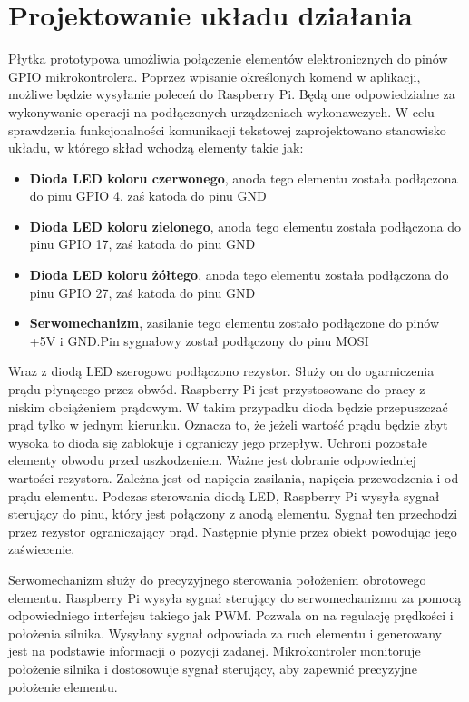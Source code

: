 \section{Projektowanie układu działania}
 Płytka prototypowa umożliwia połączenie elementów elektronicznych do pinów GPIO mikrokontrolera. Poprzez wpisanie określonych komend w aplikacji, możliwe będzie wysyłanie poleceń do Raspberry Pi. Będą one odpowiedzialne za wykonywanie operacji na podłączonych urządzeniach wykonawczych. W celu sprawdzenia funkcjonalności komunikacji tekstowej zaprojektowano stanowisko układu, w którego skład wchodzą elementy takie jak: 
\begin{itemize}  
	\item \textbf{Dioda LED koloru czerwonego}, anoda tego elementu została podłączona do pinu GPIO 4, zaś katoda do pinu GND
	\\
\item \textbf{Dioda LED koloru zielonego}, anoda tego elementu została podłączona do pinu GPIO 17, zaś katoda do pinu GND
	\\
\item \textbf{Dioda LED koloru żółtego}, anoda tego elementu została podłączona do pinu GPIO 27, zaś katoda do pinu GND
	\\
	\item \textbf{Serwomechanizm}, zasilanie tego elementu zostało podłączone do pinów +5V i GND.Pin sygnałowy został podłączony do pinu MOSI
	\\
\end{itemize}
Wraz z diodą LED szerogowo podłączono rezystor. Służy on do ogarniczenia prądu płynącego przez obwód. Raspberry Pi jest przystosowane do pracy z niskim obciążeniem prądowym. W takim przypadku dioda będzie przepuszczać prąd tylko w jednym kierunku. Oznacza to, że jeżeli wartość prądu będzie zbyt wysoka to dioda się zablokuje i ograniczy jego przepływ. Uchroni pozostałe elementy obwodu przed uszkodzeniem. Ważne jest dobranie odpowiedniej wartości rezystora. Zależna jest od napięcia zasilania, napięcia przewodzenia i od prądu elementu. Podczas sterowania diodą LED, Raspberry Pi wysyła sygnał sterujący do pinu, który jest połączony z anodą elementu. Sygnał ten przechodzi przez rezystor ograniczający prąd. Następnie płynie przez obiekt powodując jego zaświecenie.

Serwomechanizm służy do precyzyjnego sterowania położeniem obrotowego elementu. Raspberry Pi wysyła sygnał sterujący do serwomechanizmu za pomocą odpowiedniego interfejsu takiego jak PWM. Pozwala on na regulację prędkości i położenia silnika. Wysyłany sygnał odpowiada za ruch elementu i generowany jest na podstawie informacji o pozycji zadanej. Mikrokontroler monitoruje położenie silnika i dostosowuje sygnał sterujący, aby zapewnić precyzyjne położenie elementu.




